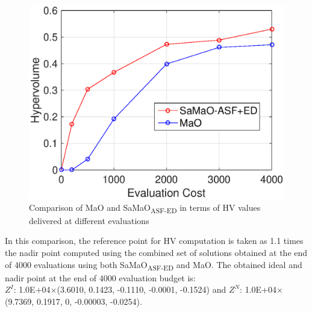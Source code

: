 \documentclass[onecolumn,10pt]{asme2ej}
\begin{document}
\begin{figure}[!htb]
	\centering    
	\includegraphics[scale = 0.8]{figures/fig13.eps}   
	\caption{Comparison of MaO and SaMaO\textsubscript{ASF-ED} in terms of HV values delivered at different evaluations}
	\label{fig:HV}
\end{figure}

In this comparison, the reference point for HV computation is taken as 1.1 times the nadir point computed using the combined set of solutions obtained at the end of 4000 evaluations using both SaMaO\textsubscript{ASF-ED} and MaO. The obtained ideal and nadir point at the end of 4000 evaluation budget is:\\ 
$Z^I$: 1.0E+04$\times$(3.6010, 0.1423, -0.1110, -0.0001, -0.1524) and $Z^N$: 1.0E+04$\times$(9.7369, 0.1917, 0, -0.00003, -0.0254).
 




\scriptsize
 
\balance

\end{document}
